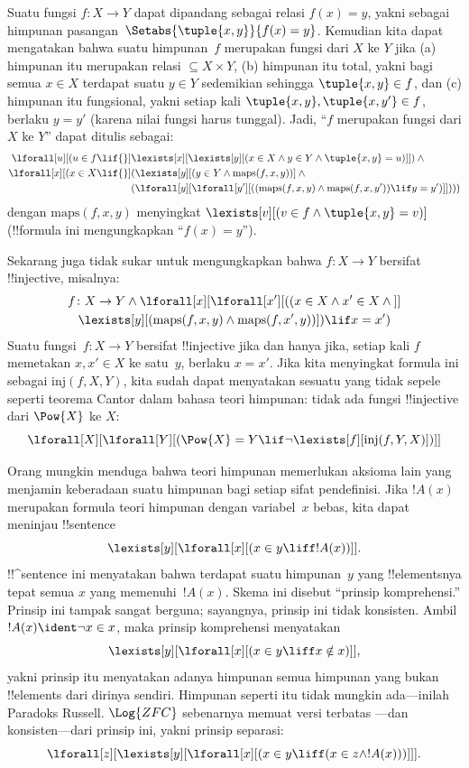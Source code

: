 \documentclass[../../../include/open-logic-section]{subfiles}
\begin{document}
Suatu fungsi $f \colon X \to Y$ dapat dipandang sebagai relasi $f(x) = y$,
yakni sebagai himpunan pasangan~$\Setabs{\tuple{x,y}}{f(x) = y}$. Kemudian
kita dapat mengatakan bahwa suatu himpunan~$f$ merupakan fungsi dari $X$ ke
$Y$ jika (a) himpunan itu merupakan relasi $\subseteq X \times Y$, (b)
himpunan itu total, yakni bagi semua $x \in X$ terdapat suatu $y \in Y$
sedemikian sehingga $\tuple{x, y} \in f$, dan (c) himpunan itu fungsional,
yakni setiap kali $\tuple{x, y}, \tuple{x, y'} \in f$, berlaku $y = y'$
(karena nilai fungsi harus tunggal). Jadi, ``$f$ merupakan fungsi dari $X$ ke
$Y$'' dapat ditulis sebagai:
\begin{align*}
 \lforall[u][(u \in f \lif {}] & \lexists[x][\lexists[y][(x \in X \land y \in
      Y \land \tuple{x, y} = u)]]) \land {}\\
 \lforall[x][(x \in X \lif {}] &
      (\lexists[y][(y \in Y \land \mathrm{maps}(f, x, y))] \land {}\\
& (\lforall[y][\lforall[y'][((\mathrm{maps}(f, x, y) \land
    \mathrm{maps}(f, x, y')) \lif y = y')]])))
\end{align*}
dengan $\mathrm{maps}(f, x, y)$ menyingkat $\lexists[v][(v \in f \land
  \tuple{x, y} = v)]$ (!!{formula} ini mengungkapkan ``$f(x) = y$'').

Sekarang juga tidak sukar untuk mengungkapkan bahwa $f\colon X \to Y$
bersifat !!{injective}, misalnya:
\begin{multline*}
 f \colon X \to Y \land \lforall[x][\lforall[x'][((x \in X \land x' \in
     X \land {}]] \\
 \lexists[y][(\mathrm{maps}(f, x, y) \land \mathrm{maps}(f,
        x', y))]) \lif x = x')
\end{multline*}
Suatu fungsi~$f\colon X \to Y$ bersifat !!{injective} jika dan hanya jika,
setiap kali $f$ memetakan $x, x' \in X$ ke satu~$y$, berlaku $x = x'$.
Jika kita menyingkat formula ini sebagai $\mathrm{inj}(f, X, Y)$, kita sudah
dapat menyatakan sesuatu yang tidak sepele seperti teorema Cantor dalam bahasa
teori himpunan: tidak ada fungsi !!{injective} dari $\Pow{X}$ ke $X$:
\[
\lforall[X][\lforall[Y][(\Pow{X} = Y \lif
    \lnot\lexists[f][\mathrm{inj}(f, Y, X)])]]
\]

Orang mungkin menduga bahwa teori himpunan memerlukan aksioma lain yang
menjamin keberadaan suatu himpunan bagi setiap sifat pendefinisi. Jika $!A(x)$
merupakan formula teori himpunan dengan variabel~$x$ bebas, kita dapat
meninjau !!{sentence}
\[
\lexists[y][\lforall[x][(x \in y \liff !A(x))]].
\]
!!^{sentence} ini menyatakan bahwa terdapat suatu himpunan~$y$ yang
!!{element}snya tepat semua $x$ yang memenuhi~$!A(x)$. Skema ini disebut
``prinsip komprehensi.'' Prinsip ini tampak sangat berguna; sayangnya, prinsip
ini tidak konsisten. Ambil $!A(x) \ident \lnot x \in x$, maka prinsip
komprehensi menyatakan
\[
\lexists[y][\lforall[x][(x \in y \liff x \notin x)]],
\]
yakni prinsip itu menyatakan adanya himpunan semua himpunan yang bukan
!!{element}s dari dirinya sendiri. Himpunan seperti itu tidak mungkin
ada---inilah Paradoks Russell. $\Log{ZFC}$ sebenarnya memuat versi terbatas
---dan konsisten---dari prinsip ini, yakni prinsip separasi:
\[
\lforall[z][\lexists[y][\lforall[x][(x \in y \liff (x \in z \land
      !A(x)))]]].
\]
\end{document}
